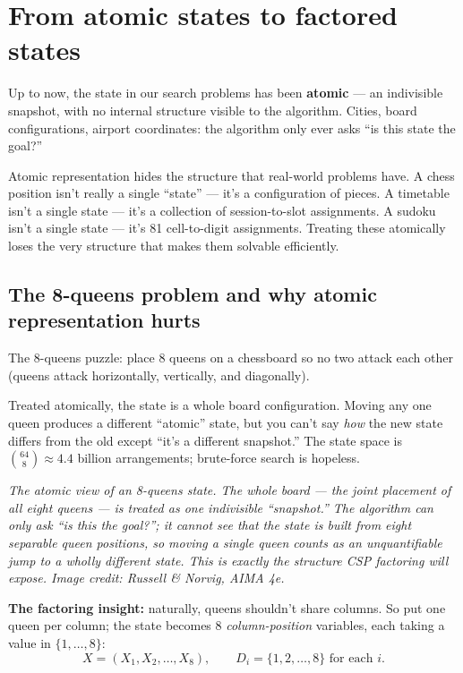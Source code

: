 \documentclass[11pt, a4paper]{article}
\begin{document}
\section{From atomic states to factored states}

Up to now, the state in our search problems has been \textbf{atomic} — an indivisible snapshot, with no internal structure visible to the algorithm. Cities, board configurations, airport coordinates: the algorithm only ever asks ``is this state the goal?''

Atomic representation hides the structure that real-world problems have. A chess position isn't really a single ``state'' — it's a configuration of pieces. A timetable isn't a single state — it's a collection of session-to-slot assignments. A sudoku isn't a single state — it's 81 cell-to-digit assignments. Treating these atomically loses the very structure that makes them solvable efficiently.

\subsection{The 8-queens problem and why atomic representation hurts}

The 8-queens puzzle: place 8 queens on a chessboard so no two attack each other (queens attack horizontally, vertically, and diagonally).

Treated atomically, the state is a whole board configuration. Moving any one queen produces a different ``atomic'' state, but you can't say \emph{how} the new state differs from the old except ``it's a different snapshot.'' The state space is $\binom{64}{8} \approx 4.4$ billion arrangements; brute-force search is hopeless.

\begin{center}

\footnotesize\textit{The atomic view of an 8-queens state. The whole board --- the joint placement of all eight queens --- is treated as one indivisible ``snapshot.'' The algorithm can only ask ``is this the goal?''; it cannot see that the state is built from eight separable queen positions, so moving a single queen counts as an unquantifiable jump to a wholly different state. This is exactly the structure CSP factoring will expose. Image credit: Russell \& Norvig, AIMA 4e.}
\end{center}

\textbf{The factoring insight:} naturally, queens shouldn't share columns. So put one queen per column; the state becomes 8 \emph{column-position} variables, each taking a value in $\{1, \dots, 8\}$:
\[
X = (X_1, X_2, \dots, X_8), \qquad D_i = \{1, 2, \dots, 8\} \text{ for each } i.
\]
\end{document}
